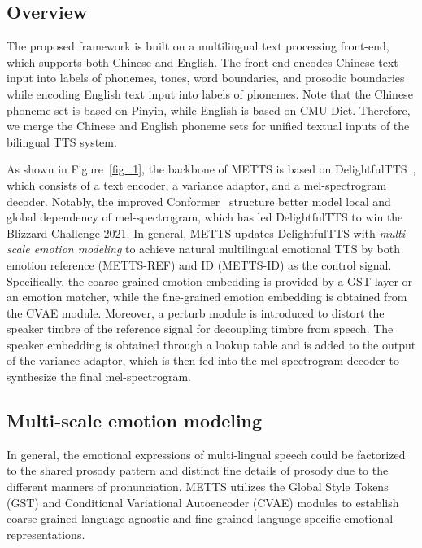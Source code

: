 \documentclass[journal,comsoc]{IEEEtran}
\begin{document}
\subsection{Overview}
\label{sc:Overview}

The proposed framework is built on a multilingual text processing front-end, which supports both Chinese and English. The front end encodes Chinese text input into labels of phonemes, tones, word boundaries, and prosodic boundaries while encoding English text input into labels of phonemes. Note that the Chinese phoneme set is based on Pinyin, while English is based on CMU-Dict. Therefore, we merge the Chinese and English phoneme sets for unified textual inputs of the bilingual TTS system.

As shown in Figure~\ref{fig_1}, the backbone of METTS is based on DelightfulTTS~\cite{DBLP:journals/corr/abs-2110-12612}, which consists of a text encoder, a variance adaptor, and a mel-spectrogram decoder. Notably, the improved Conformer~\cite{DBLP:conf/interspeech/GulatiQCPZYHWZW20} structure better model local and global dependency of mel-spectrogram, which has led DelightfulTTS to win the Blizzard Challenge 2021.
In general, METTS updates DelightfulTTS with \textit{multi-scale emotion modeling} to achieve natural multilingual emotional TTS by both emotion reference (METTS-REF) and ID (METTS-ID) as the control signal. Specifically, the coarse-grained emotion embedding is provided by a GST layer or an emotion matcher, while the fine-grained emotion embedding is obtained from the CVAE module. 
Moreover, a perturb module is introduced to distort the speaker timbre of the reference signal for decoupling timbre from speech. 
The speaker embedding is obtained through a lookup table and is added to the output of the variance adaptor, which is then fed into the mel-spectrogram decoder to synthesize the final mel-spectrogram.


\subsection{Multi-scale emotion modeling}
\label{sc:Multi-scale emotion modeling}

In general, the emotional expressions of multi-lingual speech could be factorized to the shared prosody pattern and distinct fine details of prosody due to the different manners of pronunciation. METTS utilizes the Global Style Tokens (GST) and Conditional Variational Autoencoder (CVAE) modules to establish coarse-grained language-agnostic and fine-grained language-specific emotional representations. 
\end{document}
